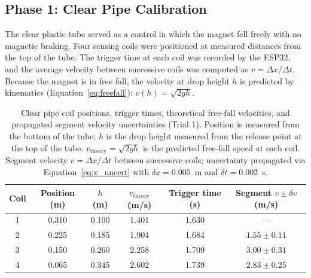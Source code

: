 \documentclass[11pt]{article}
\begin{document}
\subsection{Phase 1: Clear Pipe Calibration}

The clear plastic tube served as a control in which the magnet fell freely with no magnetic
braking. Four sensing coils were positioned at measured distances from the top of the tube.
The trigger time at each coil was recorded by the ESP32, and the average velocity between
successive coils was computed as $v = \Delta x / \Delta t$. Because the magnet is in free fall,
the velocity at drop height $h$ is predicted by kinematics (Equation~\ref{eq:freefall}):
$v(h) = \sqrt{2gh}$.

\begin{table}[H]
\centering
\caption{Clear pipe coil positions, trigger times, theoretical free-fall velocities, and
propagated segment velocity uncertainties (Trial 1). Position is measured from the bottom
of the tube; $h$ is the drop height measured from the release point at the top of the
tube. $v_\text{theory} = \sqrt{2gh}$ is the predicted free-fall speed at each coil.
Segment velocity $v = \Delta x / \Delta t$ between successive coils; uncertainty
propagated via Equation~\ref{eq:v_uncert} with $\delta x = 0.005$~m and
$\delta t = 0.002$~s.}
\label{tab:clear_trial1}
\begin{tabular}{cccccc}
\toprule
Coil & Position (m) & $h$ (m) & $v_\text{theory}$ (m/s) & Trigger time (s) &
Segment $v \pm \delta v$ (m/s) \\
\midrule
1 & 0.310 & 0.100 & 1.401 & 1.630 & ---              \\
2 & 0.225 & 0.185 & 1.904 & 1.684 & $1.55 \pm 0.11$  \\
3 & 0.150 & 0.260 & 2.258 & 1.709 & $3.00 \pm 0.31$  \\
4 & 0.065 & 0.345 & 2.602 & 1.739 & $2.83 \pm 0.25$  \\
\bottomrule
\end{tabular}
\end{table}
\end{document}

